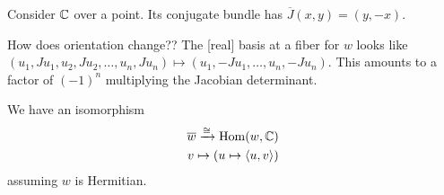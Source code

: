 \begin{example}
Consider $\mathbb{C}$ over a point. Its conjugate bundle has $\overline{J}(x,y)=(y,-x)$.
\end{example}

\begin{node}
How does orientation change?? The [real] basis at a fiber for $w$
looks like $(u_{1},Ju_{1},u_{2},Ju_{2},\dots,u_{n},Ju_{n})\mapsto(u_{1},-Ju_{1},\dots,u_{n},-Ju_{n})$.
This amounts to a factor of $(-1)^{n}$ multiplying the Jacobian determinant.
\end{node}

\begin{fact}
We have an isomorphism
\begin{align}
\overline{w}\xrightarrow{\cong}\operatorname{Hom}(w,\mathbb{C})\\
v\mapsto(u\mapsto\langle u,v\rangle)\nonumber
\end{align}
assuming $w$ is Hermitian.
\end{fact}
